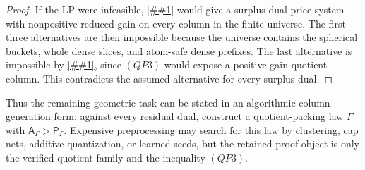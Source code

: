 \documentclass[10pt]{article}
\newcommand{\cref}[1]{\ref{##1}}
\theoremstyle{definition}
\begin{document}
\begin{proof}
   If the LP were infeasible, \cref{lem:finite-filter-cover-dual} would give a
   surplus dual price system with nonpositive reduced gain on every column in the
   finite universe.  The first three alternatives are then impossible because the
   universe contains the spherical buckets, whole dense slices, and atom-safe
   dense prefixes.  The last alternative is impossible by
   \cref{lem:quotient-packing-reduced-gain}, since \((QP3)\) would expose a
   positive-gain quotient column.  This contradicts the assumed alternative for
   every surplus dual.
\end{proof}

Thus the remaining geometric task can be stated in an algorithmic column-generation
form: against every residual dual, construct a quotient-packing law \(\Gamma\)
with \(\mathsf A_\Gamma>\mathsf P_\Gamma\).  Expensive preprocessing may search
for this law by clustering, cap nets, additive quantization, or learned seeds,
but the retained proof object is only the verified quotient family and the
inequality \((QP3)\).
\end{document}
